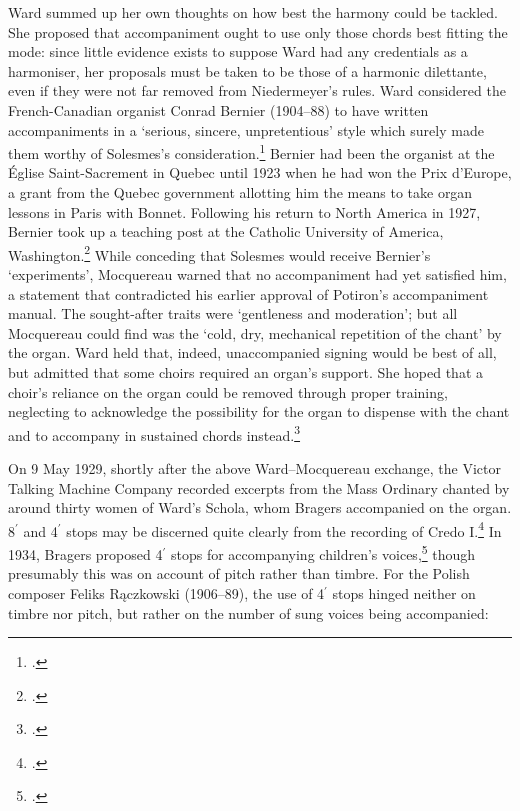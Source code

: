 Ward summed up her own thoughts on how best the harmony could be tackled.
She proposed that accompaniment ought to use only those chords best fitting the mode: since little evidence exists to suppose Ward had any credentials as a harmoniser, her proposals must be taken to be those of a harmonic dilettante, even if they were not far removed from Niedermeyer's rules.
Ward considered the French-Canadian organist Conrad Bernier (1904--88) to have written accompaniments in a `serious, sincere, unpretentious' style which surely made them worthy of Solesmes's consideration.\footcite[Ward to Mocquereau, 13 December 1928; Mocquereau to Ward 22 December 1928; Ward to Mocquereau, 2 March 1929; Excerpts reproduced in][81--2]{CombeJustineWardSolesmes1987}
Bernier had been the organist at the Église Saint-Sacrement in Quebec until 1923 when he had won the Prix d'Europe, a grant from the Quebec government allotting him the means to take organ lessons in Paris with Bonnet.
Following his return to North America in 1927, Bernier took up a teaching post at the Catholic University of America, Washington.\footnote{\covid{}\cite[287--8]{MillerEncyclopediemusiqueau1993}.}
While conceding that Solesmes would receive Bernier's `experiments', Mocquereau warned that no accompaniment had yet satisfied him, a statement that contradicted his earlier approval of Potiron's accompaniment manual.
The sought-after traits were `gentleness and moderation'; but all Mocquereau could find was the `cold, dry, mechanical repetition of the chant' by the organ.
Ward held that, indeed, unaccompanied signing would be best of all, but admitted that some choirs required an organ's support.
She hoped that a choir's reliance on the organ could be removed through proper training, neglecting to acknowledge the possibility for the organ to dispense with the chant and to accompany in sustained chords instead.\footcite[Mocquereau to Ward, 26 March 1929; Ward to Mocquereau 16 April 1929. See][82--3]{CombeJustineWardSolesmes1987}
\nowidow[2]

On 9 May 1929, shortly after the above Ward--Mocquereau exchange, the Victor Talking Machine Company recorded excerpts from the Mass Ordinary chanted by around thirty women of Ward's Schola, whom Bragers accompanied on the organ.
8$^\prime$ and 4$^\prime$ stops may be discerned quite clearly from the recording of Credo I.\footcite{VictormatrixCVE47995}
In 1934, Bragers proposed 4$^\prime$ stops for accompanying children's voices,\footcite[55]{BragersShortTreatiseGregorian1934} though presumably this was on account of pitch rather than timbre.
For the Polish composer Feliks Rączkowski (1906--89), the use of 4$^\prime$ stops hinged neither on timbre nor pitch, but rather on the number of sung voices being accompanied:

